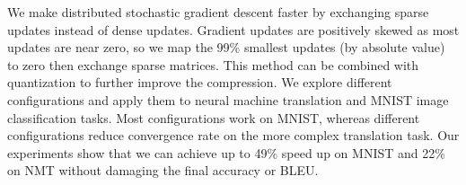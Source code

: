 We make distributed stochastic gradient descent faster by exchanging sparse updates instead of dense updates. Gradient updates are positively skewed as most updates are near zero, so we map the 99\% smallest updates (by absolute value) to zero then exchange sparse matrices. This method can be combined with quantization to further improve the compression. We explore different configurations and apply them to neural machine translation and MNIST image classification tasks. Most configurations work on MNIST, whereas different configurations reduce convergence rate on the more complex translation task. Our experiments show that we can achieve up to 49\% speed up on MNIST and 22\% on NMT without damaging the final accuracy or BLEU.
